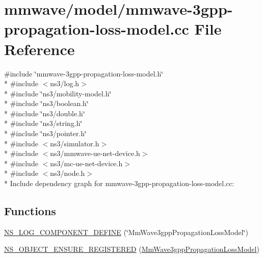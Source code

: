 \hypertarget{mmwave-3gpp-propagation-loss-model_8cc}{}\section{mmwave/model/mmwave-\/3gpp-\/propagation-\/loss-\/model.cc File Reference}
\label{mmwave-3gpp-propagation-loss-model_8cc}
{\ttfamily \#include \char`\"{}mmwave-\/3gpp-\/propagation-\/loss-\/model.\+h\char`\"{}}\\*
{\ttfamily \#include $<$ns3/log.\+h$>$}\\*
{\ttfamily \#include \char`\"{}ns3/mobility-\/model.\+h\char`\"{}}\\*
{\ttfamily \#include \char`\"{}ns3/boolean.\+h\char`\"{}}\\*
{\ttfamily \#include \char`\"{}ns3/double.\+h\char`\"{}}\\*
{\ttfamily \#include \char`\"{}ns3/string.\+h\char`\"{}}\\*
{\ttfamily \#include \char`\"{}ns3/pointer.\+h\char`\"{}}\\*
{\ttfamily \#include $<$ns3/simulator.\+h$>$}\\*
{\ttfamily \#include $<$ns3/mmwave-\/ue-\/net-\/device.\+h$>$}\\*
{\ttfamily \#include $<$ns3/mc-\/ue-\/net-\/device.\+h$>$}\\*
{\ttfamily \#include $<$ns3/node.\+h$>$}\\*
Include dependency graph for mmwave-\/3gpp-\/propagation-\/loss-\/model.cc\+:
\subsection*{Functions}
\begin{DoxyCompactItemize}
\item 
\hyperlink{mmwave-3gpp-propagation-loss-model_8cc_ac10bef3e74d065075d783f36c4444ff2}{N\+S\+\_\+\+L\+O\+G\+\_\+\+C\+O\+M\+P\+O\+N\+E\+N\+T\+\_\+\+D\+E\+F\+I\+NE} (\char`\"{}Mm\+Wave3gpp\+Propagation\+Loss\+Model\char`\"{})
\item 
\hyperlink{mmwave-3gpp-propagation-loss-model_8cc_a8b2fd40b1c5be761416484c5470f6402}{N\+S\+\_\+\+O\+B\+J\+E\+C\+T\+\_\+\+E\+N\+S\+U\+R\+E\+\_\+\+R\+E\+G\+I\+S\+T\+E\+R\+ED} (\hyperlink{classMmWave3gppPropagationLossModel}{Mm\+Wave3gpp\+Propagation\+Loss\+Model})
\end{DoxyCompactItemize}


